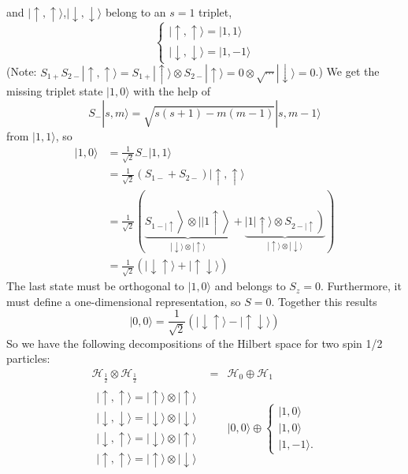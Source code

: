 and $|\uparrow,\uparrow\rangle$,$|\downarrow,\downarrow\rangle$ belong to an $s = 1$ triplet,
\begin{equation}
\left\{\begin{array}{l}{|\uparrow, \uparrow\rangle=|1,1\rangle} \\ {|\downarrow, \downarrow\rangle=|1,-1\rangle}\end{array}\right.
\end{equation}
(Note: $S_{1+} S_{2-}|\uparrow, \uparrow\rangle= S_{1+}|\uparrow\rangle \otimes S_{2-}|\uparrow\rangle= 0 \otimes \sqrt{\cdots}|\downarrow\rangle= 0$.) We get the missing triplet state $| 1, 0\rangle$ with the help of
\begin{equation}
    S_{-}|s, m\rangle=\sqrt{s(s+1)-m(m-1)}|s, m-1\rangle
    \end{equation}
from $| 1, 1\rangle$, so
\begin{equation}
\begin{aligned}|1,0\rangle &=\frac{1}{\sqrt{2}} S_{-}|1,1\rangle \\ &=\frac{1}{\sqrt{2}}\left(S_{1-}+S_{2-}\right)|\uparrow, \uparrow\rangle \\ &=\frac{1}{\sqrt{2}}(\underbrace{\left.\left.S_{1-| \uparrow}\right\rangle \otimes ||1 \uparrow\right\rangle}_{|\downarrow\rangle \otimes|\uparrow\rangle}+\underbrace{\left.|1| \uparrow\rangle \otimes S_{2-| \uparrow}\right)}_{|\uparrow\rangle \otimes|\downarrow\rangle}) \\ &=\frac{1}{\sqrt{2}}(|\downarrow \uparrow\rangle+|\uparrow \downarrow\rangle) \end{aligned}
\end{equation}
The last state must be orthogonal to $| 1, 0\rangle$ and belongs to $S_z = 0$. Furthermore, it must define a one-dimensional representation, so $S = 0$. Together this results
\begin{equation}
    |0,0\rangle=\frac{1}{\sqrt{2}}(|\downarrow \uparrow\rangle-|\uparrow \downarrow\rangle)
    \end{equation}
So we have the following decompositions of the Hilbert space for two spin 1/2 particles:
%
\begin{equation}
\begin{array}{rcl}
\mathcal{H}_{\frac{1}{2}} \otimes \mathcal{H}_{\frac{1}{2}} &=&\mathcal{H}_{0} \oplus \mathcal{H}_{1} \\
\begin{aligned}
    |\uparrow, \uparrow\rangle =|\uparrow\rangle \otimes|\uparrow\rangle \\|\downarrow, \downarrow\rangle =|\downarrow\rangle \otimes|\downarrow\rangle \\|\downarrow, \uparrow\rangle =|\downarrow\rangle \otimes|\uparrow\rangle \\|\uparrow, \uparrow\rangle =|\uparrow\rangle \otimes|\downarrow\rangle
\end{aligned} & & |0,0\rangle\oplus\left\{\begin{array}{l}
    |1,0\rangle \\ |1,0\rangle \\|1,-1\rangle.
\end{array}\right.
\end{array}
\end{equation}
